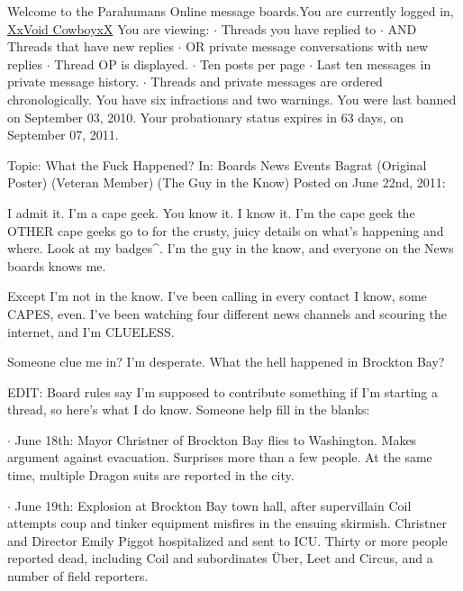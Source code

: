





Welcome to the Parahumans Online message boards.You are currently logged in, \underline{XxVoid CowboyxX}
You are viewing:
$\cdot$  Threads you have replied to
$\cdot$  AND Threads that have new replies
$\cdot$  OR private message conversations with new replies
$\cdot$  Thread OP is displayed.
$\cdot$  Ten posts per page
$\cdot$  Last ten messages in private message history.
$\cdot$  Threads and private messages are ordered chronologically.
You have six infractions and two warnings.  You were last banned on September 03, 2010.  Your probationary status expires in 63 days, on September 07, 2011.



\blacksquare



\blacklozenge  Topic:  What the Fuck Happened?
In:  Boards \blacktriangleright News \blacktriangleright Events \blacktrianglerightAmerica
Bagrat (Original Poster) (Veteran Member) (The Guy in the Know)
Posted on June 22nd, 2011:



I admit it.  I'm a cape geek.  You know it.  I know it.  I'm the cape geek the OTHER cape geeks go to for the crusty, juicy details on what's happening and where.  Look at my badges^.  I'm the guy in the know, and everyone on the News boards knows me.



Except I'm not in the know.  I've been calling in every contact I know, some CAPES, even.  I've been watching four different news channels and scouring the internet, and I'm CLUELESS.



Someone clue me in?  I'm desperate.  What the hell happened in Brockton Bay?



EDIT:  Board rules say I'm supposed to contribute something if I'm starting a thread, so here's what I do know.  Someone help fill in the blanks:



$\cdot$  June 18th:  Mayor Christner of Brockton Bay flies to Washington.  Makes argument against evacuation.  Surprises more than a few people.  At the same time, multiple Dragon suits are reported in the city.



$\cdot$  June 19th:  Explosion at Brockton Bay town hall, after supervillain Coil attempts coup and tinker equipment misfires in the ensuing skirmish.  Christner and Director Emily Piggot hospitalized and sent to ICU.  Thirty or more people reported dead, including Coil and subordinates \"{U}ber, Leet and Circus, and a number of field reporters.



